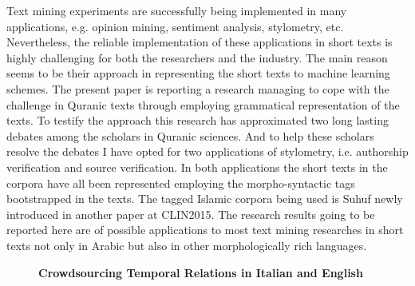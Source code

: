 \documentclass[10pt, a4paper, twopage, headinclude, footinclude, BCOR5mm]{scrartcl}
\begin{document}
\noindent
Text mining experiments are successfully being implemented in many applications, e.g. opinion mining, sentiment analysis, stylometry, etc. Nevertheless, the reliable implementation of these applications in short texts is highly challenging for both the researchers and the industry. The main reason seems to be their approach in representing the short texts to machine learning schemes. The present paper is reporting a research managing to cope with the challenge in Quranic texts through employing grammatical representation of the texts. To testify the approach this research has approximated two long lasting debates among the scholars in Quranic sciences. And to help these scholars resolve the debates I have opted for two applications of stylometry, i.e. authorship verification and source verification. In both applications the short texts in the corpora have all been represented employing the morpho-syntactic tags bootstrapped in the texts. The tagged Islamic corpora being used is Suhuf newly introduced in another paper at CLIN2015. The research results going to be reported here are of possible applications to most text mining researches in short texts not only in Arabic but also in other morphologically rich languages.


\newpage

\begin{figure}[t!]
\centering
\large\textbf{Crowdsourcing Temporal Relations in Italian and English}
\vspace*{0.5cm}
\end{figure}


        \begin{table}[t!]
    \end{table}
\end{document}
